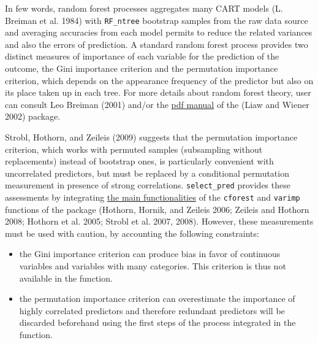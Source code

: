 In few words, random forest processes aggregates many CART models (L. Breiman et al. 1984) with
\texttt{RF\_ntree} bootstrap samples from the raw data source and averaging accuracies from each model permits to reduce the related variances and also the errors of prediction. A standard random forest process provides two distinct measures of importance of each variable for the prediction of the outcome, the Gini importance criterion and the permutation importance criterion, which depends on the appearance frequency of the predictor but also on its place taken up in each tree. For more details about random forest theory, user can consult Leo Breiman (2001) and/or the \href{https://cran.r-project.org//web//packages//randomForest//randomForest.pdf}{pdf manual} of the  (Liaw and Wiener 2002) package.

Strobl, Hothorn, and Zeileis (2009) suggests that the permutation importance criterion, which works with permuted samples (subsampling without replacements) instead of bootstrap ones, is particularly convenient with uncorrelated predictors, but must be replaced by a conditional permutation measurement in presence of strong correlations. \texttt{select\_pred} provides these assessments by integrating \href{https://cran.r-project.org/web/packages/party/party.pdf}{the main functionalities} of the \texttt{cforest} and \texttt{varimp} functions of the package (Hothorn, Hornik, and Zeileis 2006; Zeileis and Hothorn 2008; Hothorn et al. 2005; Strobl et al. 2007, 2008). However, these measurements must be used with caution, by accounting the following constraints:

\begin{itemize}
\tightlist
\item
  the Gini importance criterion can produce bias in favor of continuous variables and variables with many categories. This criterion is thus not available in the function.
\item
  the permutation importance criterion can overestimate the importance of highly correlated predictors and therefore redundant predictors will be discarded beforehand using the first steps of the process integrated in the function.
\end{itemize}

